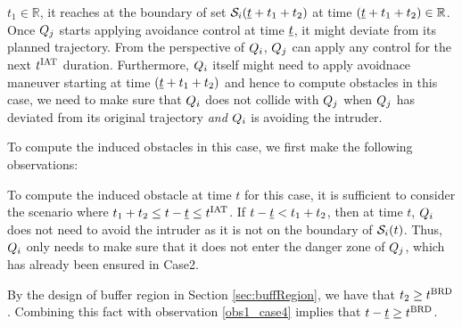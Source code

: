 \begin{itemize}[leftmargin=*]
 $t_1 \in \mathbb{R}$, it reaches at the boundary of set $\mathcal{S}_i(\underline{t} + t_1 + t_2)$ at time $(\underline{t} + t_1 + t_2) \in \mathbb{R}$. Once $Q_j$ starts applying avoidance control at time $\underline{t}$, it might deviate from its planned trajectory. From the perspective of $Q_i$, $Q_j$ can apply any control for the next $t^\text{IAT}$ duration. Furthermore, $Q_i$ itself might need to apply avoidnace maneuver starting at time $(\underline{t} + t_1 + t_2)$ and hence to compute obstacles in this case, we need to make sure that $Q_i$ does not collide with $Q_j$ when $Q_j$ has deviated from its original trajectory \textit{and} $Q_i$ is avoiding the intruder.   

To compute the induced obstacles in this case, we first make the following observations:
\begin{observation} \label{obs1_case4}
To compute the induced obstacle at time $t$ for this case, it is sufficient to consider the scenario where $t_1 + t_2 \leq t - \underline{t} \leq t^\text{IAT}$. If $t - \underline{t} < t_1 + t_2$, then at time $t$, $Q_i$ does not need to avoid the intruder as it is not on the boundary of $\mathcal{S}_i(t)$. Thus, $Q_i$ only needs to make sure that it does not enter the danger zone of $Q_j$, which has already been ensured in Case2. 
\end{observation}
\begin{observation} \label{obs2_case4}
By the design of buffer region in Section \ref{sec:buffRegion}, we have that $t_2 \geq t^\text{BRD}$. Combining this fact with observation \ref{obs1_case4} implies that $t- \underline{t} \geq t^\text{BRD}$.
\end{observation}


\end{itemize}
